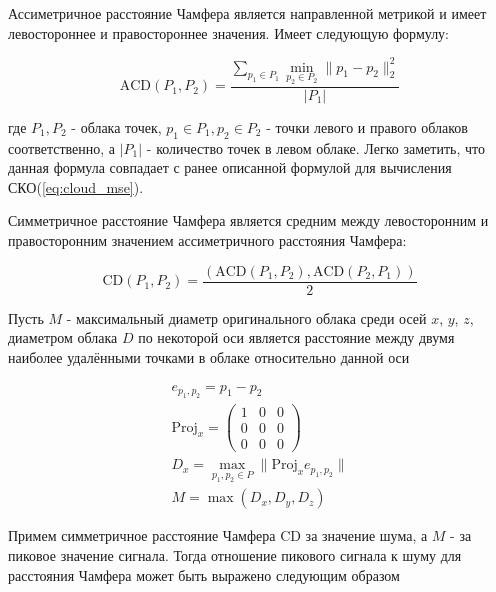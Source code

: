 Ассиметричное расстояние Чамфера является направленной метрикой и имеет
левостороннее и правостороннее значения. Имеет следующую формулу:

\begin{equation} \label{eq:asym_chamfer}
    \text{ACD}\left(P_{1}, P_{2}\right) = \frac{
        \sum_{p_{1} \in P_{1}} \min_{p_{2} \in P_{2}} \lVert p_{1} - p_{2} \rVert_{2}^{2}
    }{
        \left| P_{1} \right|
    }
\end{equation}

где $P_{1}, P_{2}$ - облака точек, $p_{1} \in P_{1}, p_{2} \in P_{2}$ - точки
левого и правого облаков соответственно, а $\left| P_{1} \right|$ - количество
точек в левом облаке. Легко заметить, что данная формула совпадает с ранее
описанной формулой для вычисления СКО(\ref{eq:cloud_mse}).

Симметричное расстояние Чамфера является средним между левосторонним и
правосторонним значением ассиметричного расстояния Чамфера:

\begin{equation} \label{eq:sym_chamfer}
    \text{CD}\left(P_{1}, P_{2}\right) = \frac{
        \left(
            \text{ACD}\left(P_{1}, P_{2}\right),
            \text{ACD}\left(P_{2}, P_{1}\right)
        \right)
    }{2}
\end{equation}

Пусть $M$ - максимальный диаметр оригинального облака среди осей $x$, $y$, $z$,
диаметром облака $D$ по некоторой оси является расстояние между двумя наиболее
удалёнными точками в облаке относительно данной оси

\begin{gather} \label{eq:cloud_diam}
    e_{p_{1}, p_{2}} = p_{1} - p_{2} \nonumber \\
    \text{Proj}_{x} = \begin{pmatrix}
        1 & 0 & 0 \\
        0 & 0 & 0 \\
        0 & 0 & 0
    \end{pmatrix} \nonumber \\
    D_{x} = \max_{p_{1}, p_{2} \in P} \lVert \text{Proj}_{x} e_{p_{1}, p_{2}} \rVert \nonumber \\
    M = \max \left(D_{x}, D_{y}, D_{z}\right)
\end{gather}

Примем симметричное расстояние Чамфера $\text{CD}$ за значение шума, а $M$ - за
пиковое значение сигнала. Тогда отношение пикового сигнала к шуму для расстояния
Чамфера может быть выражено следующим образом

